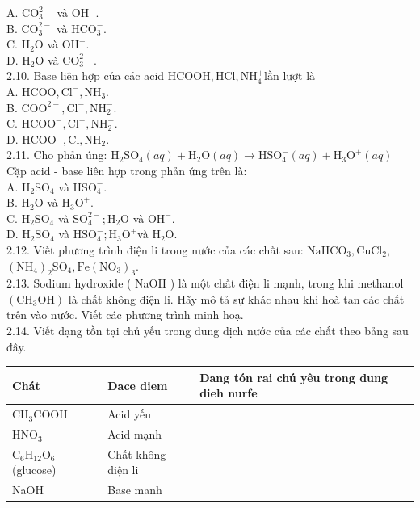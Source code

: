 \documentclass[10pt]{article}
\begin{document}
A. $\mathrm{CO}_{3}^{2-}$ và $\mathrm{OH}^{-}$.\\
B. $\mathrm{CO}_{3}^{2-}$ và $\mathrm{HCO}_{3}^{-}$.\\
C. $\mathrm{H}_{2} \mathrm{O}$ và $\mathrm{OH}^{-}$.\\
D. $\mathrm{H}_{2} \mathrm{O}$ và $\mathrm{CO}_{3}^{2-}$.\\
2.10. Base liên hợp của các acid $\mathrm{HCOOH}, \mathrm{HCl}, \mathrm{NH}_{4}^{+}$lần lượt là\\
A. $\mathrm{HCOO}, \mathrm{Cl}^{-}, \mathrm{NH}_{3}$.\\
B. $\mathrm{COO}^{2-}, \mathrm{Cl}^{-}, \mathrm{NH}_{2}^{-}$.\\
C. $\mathrm{HCOO}^{-}, \mathrm{Cl}^{-}, \mathrm{NH}_{2}^{-}$.\\
D. $\mathrm{HCOO}^{-}, \mathrm{Cl}, \mathrm{NH}_{2}$.\\
2.11. Cho phản úng: $\mathrm{H}_{2} \mathrm{SO}_{4}(a q)+\mathrm{H}_{2} \mathrm{O}(a q) \rightarrow \mathrm{HSO}_{4}^{-}(a q)+\mathrm{H}_{3} \mathrm{O}^{+}(a q)$ Cặp acid - base liên hợp trong phản ứng trên là:\\
A. $\mathrm{H}_{2} \mathrm{SO}_{4}$ và $\mathrm{HSO}_{4}^{-}$.\\
B. $\mathrm{H}_{2} \mathrm{O}$ và $\mathrm{H}_{3} \mathrm{O}^{+}$.\\
C. $\mathrm{H}_{2} \mathrm{SO}_{4}$ và $\mathrm{SO}_{4}^{2-} ; \mathrm{H}_{2} \mathrm{O}$ và $\mathrm{OH}^{-}$.\\
D. $\mathrm{H}_{2} \mathrm{SO}_{4}$ và $\mathrm{HSO}_{4}^{-} ; \mathrm{H}_{3} \mathrm{O}^{+}$và $\mathrm{H}_{2} \mathrm{O}$.\\
2.12. Viết phương trình điện li trong nước của các chất sau: $\mathrm{NaHCO}_{3}, \mathrm{CuCl}_{2}$, $\left(\mathrm{NH}_{4}\right)_{2} \mathrm{SO}_{4}, \mathrm{Fe}\left(\mathrm{NO}_{3}\right)_{3}$.\\
2.13. Sodium hydroxide ( NaOH ) là một chất điện li mạnh, trong khi methanol $\left(\mathrm{CH}_{3} \mathrm{OH}\right)$ là chất không điện li. Hãy mô tả sự khác nhau khi hoà tan các chất trên vào nước. Viết các phương trình minh hoạ.\\
2.14. Viết dạng tồn tại chủ yếu trong dung dịch nước của các chất theo bảng sau đây.

\begin{center}
\begin{tabular}{|l|l|l|}
\hline
Chát & Dace diem & Dang tón rai chú yêu trong dung dieh nurfe \\
\hline
$\mathrm{CH}_{3} \mathrm{COOH}$ & Acid yếu &  \\
\hline
$\mathrm{HNO}_{3}$ & Acid mạnh &  \\
\hline
$\mathrm{C}_{6} \mathrm{H}_{12} \mathrm{O}_{6}$ (glucose) & Chất không điện li &  \\
\hline
NaOH & Base manh &  \\
\hline
\end{tabular}
\end{center}
\end{document}
